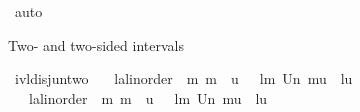 \begin{isabellebody}
%
\isadelimproof
%
\endisadelimproof
%
\isatagproof
{}\isamarkupfalse%
\ auto%
\endisatagproof
{\isafoldproof}%
%
\isadelimproof
%
\endisadelimproof
%
\begin{isamarkuptext}%
Two- and two-sided intervals%
\end{isamarkuptext}\isamarkuptrue%
\isamarkupfalse%
\ ivl{\isacharunderscore}{\kern0pt}disj{\isacharunderscore}{\kern0pt}un{\isacharunderscore}{\kern0pt}two{\isacharcolon}{\kern0pt}\isanewline
\ \ {\isachardoublequoteopen}{\isacharbrackleft}{\kern0pt}{\isacharbar}{\kern0pt}\ {\isacharparenleft}{\kern0pt}l{\isacharcolon}{\kern0pt}{\isacharcolon}{\kern0pt}{\isacharprime}{\kern0pt}a{\isacharcolon}{\kern0pt}{\isacharcolon}{\kern0pt}linorder{\isacharparenright}{\kern0pt}\ {\isacharless}{\kern0pt}\ m{\isacharsemicolon}{\kern0pt}\ m\ {\isasymle}\ u\ {\isacharbar}{\kern0pt}{\isacharbrackright}{\kern0pt}\ {\isacharequal}{\kern0pt}{\isacharequal}{\kern0pt}{\isachargreater}{\kern0pt}\ {\isacharbraceleft}{\kern0pt}l{\isacharless}{\kern0pt}{\isachardot}{\kern0pt}{\isachardot}{\kern0pt}{\isacharless}{\kern0pt}m{\isacharbraceright}{\kern0pt}\ Un\ {\isacharbraceleft}{\kern0pt}m{\isachardot}{\kern0pt}{\isachardot}{\kern0pt}{\isacharless}{\kern0pt}u{\isacharbraceright}{\kern0pt}\ {\isacharequal}{\kern0pt}\ {\isacharbraceleft}{\kern0pt}l{\isacharless}{\kern0pt}{\isachardot}{\kern0pt}{\isachardot}{\kern0pt}{\isacharless}{\kern0pt}u{\isacharbraceright}{\kern0pt}{\isachardoublequoteclose}\isanewline
\ \ {\isachardoublequoteopen}{\isacharbrackleft}{\kern0pt}{\isacharbar}{\kern0pt}\ {\isacharparenleft}{\kern0pt}l{\isacharcolon}{\kern0pt}{\isacharcolon}{\kern0pt}{\isacharprime}{\kern0pt}a{\isacharcolon}{\kern0pt}{\isacharcolon}{\kern0pt}linorder{\isacharparenright}{\kern0pt}\ {\isasymle}\ m{\isacharsemicolon}{\kern0pt}\ m\ {\isacharless}{\kern0pt}\ u\ {\isacharbar}{\kern0pt}{\isacharbrackright}{\kern0pt}\ {\isacharequal}{\kern0pt}{\isacharequal}{\kern0pt}{\isachargreater}{\kern0pt}\ {\isacharbraceleft}{\kern0pt}l{\isacharless}{\kern0pt}{\isachardot}{\kern0pt}{\isachardot}{\kern0pt}m{\isacharbraceright}{\kern0pt}\ Un\ {\isacharbraceleft}{\kern0pt}m{\isacharless}{\kern0pt}{\isachardot}{\kern0pt}{\isachardot}{\kern0pt}{\isacharless}{\kern0pt}u{\isacharbraceright}{\kern0pt}\ {\isacharequal}{\kern0pt}\ {\isacharbraceleft}{\kern0pt}l{\isacharless}{\kern0pt}{\isachardot}{\kern0pt}{\isachardot}{\kern0pt}{\isacharless}{\kern0pt}u{\isacharbraceright}{\kern0pt}{\isachardoublequoteclose}\isanewline

\end{isabellebody}
